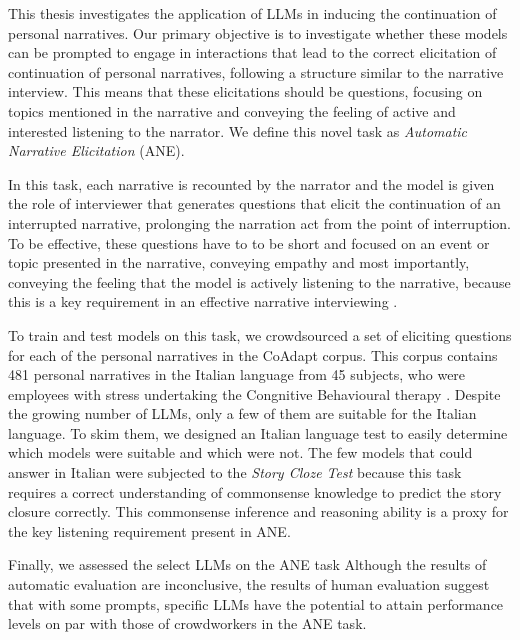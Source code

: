 This thesis investigates the application of LLMs in inducing the continuation of personal narratives. Our primary objective is to investigate whether these models can be prompted to engage in interactions that lead to the correct elicitation of continuation of personal narratives, following a structure similar to the narrative interview. This means that these elicitations should be questions, focusing on topics mentioned in the narrative and conveying the feeling of active and interested listening to the narrator. We define this novel task as \emph{Automatic Narrative Elicitation} (ANE). 

In this task, each narrative is recounted by the narrator and the model is given the role of interviewer that generates questions that elicit the continuation of an interrupted narrative, prolonging the narration act from the point of interruption. To be effective, these questions have to to be short and focused on an event or topic presented in the narrative, conveying empathy and most importantly, conveying the feeling that the model is actively listening to the narrative, because this is a key requirement in an effective narrative interviewing \cite{Kim2015-es}.

To train and test models on this task, we crowdsourced a set of eliciting questions for each of the personal narratives in the CoAdapt corpus. This corpus contains 481 personal narratives in the Italian language from 45 subjects, who were employees with stress undertaking the Congnitive Behavioural therapy \cite{coadapt}. Despite the growing number of LLMs, only a few of them are suitable for the Italian language. To skim them, we designed an Italian language test to easily determine which models were suitable and which were not. The few models that could answer in Italian were subjected to the \emph{Story Cloze Test} \cite{mostafazadeh2016corpus} because this task requires a correct understanding of commonsense knowledge to predict the story closure correctly. This commonsense inference and reasoning ability is a proxy for the key listening requirement present in ANE. %

Finally, we assessed the select LLMs on the ANE task 
Although the results of automatic evaluation are inconclusive, the results of human evaluation suggest that with some prompts, specific LLMs have the potential to attain performance levels on par with those of crowdworkers in the ANE task. %


